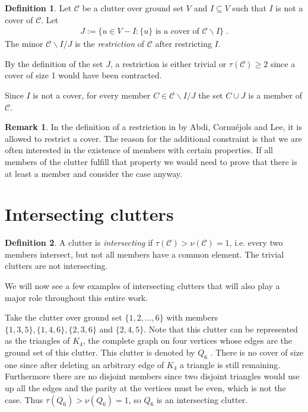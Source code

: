 \documentclass[a4paper, 12pt, twoside=false]{scrbook}
\theoremstyle{definition}
\newtheorem*{definition}{Definition}
\newtheorem*{remark}{Remark}
\begin{document}
\begin{definition}
    Let $\mathcal{C}$ be a clutter over ground set $V$ and $I \subseteq V$ such that $I$ is not a cover of $\mathcal{C}$.
    Let
    \begin{align*}
        J := \{u \in V-I : \{u\} \text{ is a cover of } \mathcal{C} \backslash I\} \;.
    \end{align*}
    The minor $\mathcal{C} \backslash I / J$ is the \emph{restriction} of $\mathcal{C}$ after restricting $I$.
\end{definition}

By the definition of the set $J$, a restriction is either trivial or $\tau(\mathcal{C}) \geq 2$ since a cover of size 1 would have been contracted.

Since $I$ is not a cover, for every member $C \in \mathcal{C} \backslash I /J$ the set $C \cup J$ is a member of $\mathcal{C}$.

\begin{remark}
    In the definition of a restriction in \cite{restrictions} by Abdi, Cornuéjols and Lee, it is allowed to restrict a cover.
    The reason for the additional constraint is that we are often interested in the existence of members with certain properties.
    If all members of the clutter fulfill that property we would need to prove that there is at least a member and consider the case anyway.
\end{remark}


\section{Intersecting clutters}
\begin{definition}
    A clutter is \emph{intersecting} if $\tau(\mathcal{C}) > \nu(\mathcal{C}) = 1$, i.e. every two members intersect, but not all members have a common element.
    The trivial clutters are not intersecting.
\end{definition}
We will now see a few examples of intersecting clutters that will also play a major role throughout this entire work.


Take the clutter over ground set $\{1,2,\ldots,6\}$ with members $\{1,3,5\}, \{1,4,6\}, \{2,3,6\}$ and $\{2,4,5\}$.
Note that this clutter can be represented as the triangles of $K_4$, the complete graph on four vertices whose edges are the ground set of this clutter.
This clutter is denoted by $Q_6$ \cite{q6}.
There is no cover of size one since after deleting an arbitrary edge of $K_4$ a triangle is still remaining.
Furthermore there are no disjoint members since two disjoint triangles would use up all the edges and the parity at the vertices must be even, which is not the case.
Thus $\tau(Q_6) > \nu(Q_6) = 1$, so $Q_6$ is an intersecting clutter.
\end{document}
